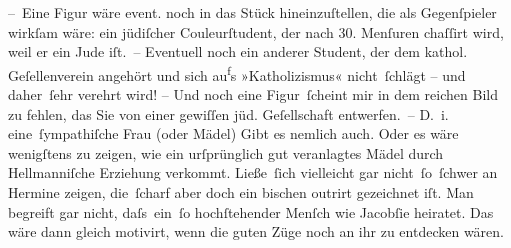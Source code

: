 \pstart
           – Eine Figur wäre event. noch in das Stück hineinzuſtellen, die als Gegenſpieler wirkſam wäre:
               ein jüdiſcher Couleur{\pb}ſtudent, der nach 30. Menſuren
               chaſſirt wird, weil er ein Jude iſt. – Eventuell noch ein anderer Student, der
               dem kathol. Geſellenverein angehört und sich au\substVorne{}\textsuperscript{f}\substDazwischen{}s\substHinten{} »Katholizismus« nicht ſchlägt – und daher ſehr verehrt wird! – Und noch eine
               Figur ſcheint mir in dem reichen Bild zu fehlen, das Sie von einer gewiſſen jüd.
               Geſellschaft \strikeout{\textcolor{gray}{×}\-\textcolor{gray}{×}\-\textcolor{gray}{×}\-\textcolor{gray}{×}} entwerfen. – D. i. eine ſympathiſche Frau (oder
               Mädel) Gibt es nemlich auch. Oder es wäre wenigſtens {\pb}zu
               zeigen, wie ein urſprünglich gut veranlagtes Mädel durch Hellmanniſche Erziehung verkommt.
               Ließe ſich vielleicht gar nicht ſo ſchwer an Hermine zeigen, die ſcharf aber doch ein bischen outrirt
               gezeichnet iſt. Man begreift gar nicht, daſs ein ſo hochſtehender Menſch wie Jacobſie heiratet. Das wäre
               dann gleich motivirt, wenn die guten Züge noch an ihr zu entdecken wären.\pend
           
